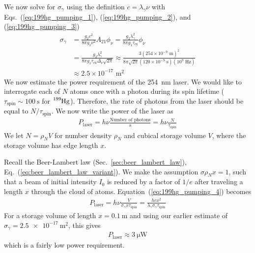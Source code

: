 We now solve for $\sigma_\gamma$ using the definition $c=\lambda_\gamma \nu$ with Eqs.~(\ref{eq:199hg_pumping_1}), (\ref{eq:199hg_pumping_2}), and (\ref{eq:199hg_pumping_3})
%
\begin{align}
    \sigma_\gamma &= \frac{g_2 c^2}{8\pi g_1 \nu^2}A_{21}\phi_\nu = \frac{g_2 \lambda_\gamma^2}{8\pi g_1 \tau_\text{ex}}\phi_\nu \\
    &= \frac{g_2 \lambda_\gamma^2}{8\pi g_1 \tau_\text{ex}\Delta_\nu \sqrt{2\pi}} \approx \frac{3 (254\times 10^{-9} \text{ m})^2}{8\pi\sqrt{2\pi} (120\times 10^{-9}\text{ s})(10^9\text{ Hz})} \\
    &\approx 2.5 \times 10^{-17} \text{ m}^2
\end{align}
%
We now estimate the power requirement of the \qty{254}{\nano\meter} laser. We would like to interrogate each of $N$ atoms once with a photon during its spin lifetime ($\tau_\text{spin}\sim \qty{100}{\s}$ for $\ce{^199Hg}$). Therefore, the rate of photons from the laser should be equal to $N/\tau_\text{spin}$. We now write the power of the laser as
%
\begin{gather}
    P_\text{laser}=h\nu \frac{\text{Number of photons}}{\text{s}}=h\nu\frac{N}{\tau_\text{spin}}\label{eq:199hg_pumping_4}
\end{gather}
%
We let $N=\rho_N V$ for number density $\rho_N$ and cubical storage volume $V$, where the storage volume has edge length $x$.

Recall the Beer-Lambert law (Sec.~\ref{sec:beer_lambert_law}), Eq.~(\ref{eq:beer_lambert_law_variant}). We make the assumption $\sigma \rho_N x=1$, such that a beam of initial intensity $I_0$ is reduced by a factor of $1/e$ after traveling a length $x$ through the cloud of atoms. Equation~(\ref{eq:199hg_pumping_4}) becomes
%
\begin{gather}
    P_\text{laser}=h\nu \frac{V}{\sigma_\gamma x \tau_\text{spin}} = \frac{hcx^2}{\lambda_\gamma \sigma_\gamma \tau_\text{spin}}
\end{gather}
%
For a storage volume of length $x=\qty{0.1}{\meter}$ and using our earlier estimate of $\sigma_\gamma=\qty{2.5e-17}{\meter^2}$, this gives
%
\begin{gather}
    P_\text{laser}\approx \qty{3}{\micro\watt}
\end{gather}
%
which is a fairly low power requirement.